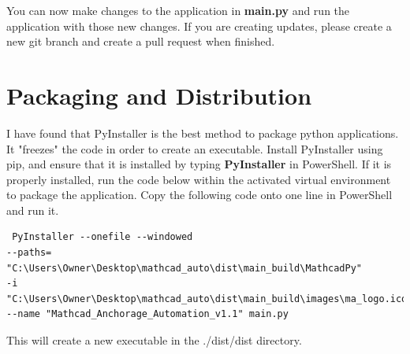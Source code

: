 \documentclass[11pt]{article}
\begin{document}
You can now make changes to the application in \textbf{main.py} and run the application with those new changes. If you are creating updates, please create a new git branch and create a pull request when finished. 

\section{Packaging and Distribution}
\label{sec:org4e8f643}
I have found that PyInstaller is the best method to package python applications. It "freezes" the code in order to create an executable. Install PyInstaller using pip, and ensure that it is installed by typing \textbf{PyInstaller} in PowerShell. If it is properly installed, run the code below within the activated virtual environment to package the application. Copy the following code onto one line in PowerShell and run it.
\begin{verbatim}
 PyInstaller --onefile --windowed 
--paths= "C:\Users\Owner\Desktop\mathcad_auto\dist\main_build\MathcadPy"
-i  "C:\Users\Owner\Desktop\mathcad_auto\dist\main_build\images\ma_logo.ico" 
--name "Mathcad_Anchorage_Automation_v1.1" main.py
\end{verbatim}

This will create a new executable in the ./dist/dist directory. 
\end{document}
